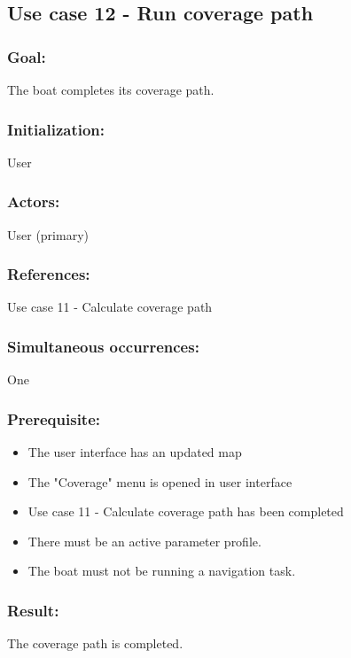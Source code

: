 \begin{framed}
	\subsection{Use case 12 - Run coverage path}
	\subsubsection*{Goal:}
	The boat completes its coverage path.
	
	\subsubsection*{Initialization:}
	User
	
	\subsubsection*{Actors:}
	User (primary)
	
	\subsubsection*{References:}
	Use case 11 - Calculate coverage path
	
	\subsubsection*{Simultaneous occurrences:}
	One 
	
	\subsubsection*{Prerequisite:}
	\begin{itemize}
		\item The user interface has an updated map
		\item The "Coverage" menu is opened in user interface
		\item Use case 11 - Calculate coverage path has been completed
		\item There must be an active parameter profile.
		\item The boat must not be running a navigation task.
	\end{itemize}
	
	\subsubsection*{Result:}
	The coverage path is completed.
	

\end{framed}
